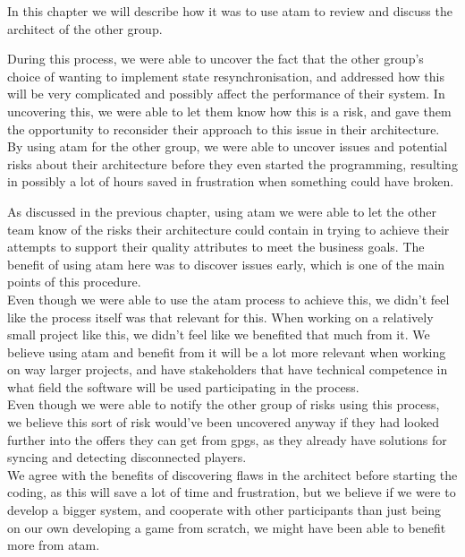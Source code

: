 In this chapter we will describe how it was to use \gls{atam} to review and discuss the architect of the other group.

During this process, we were able to uncover the fact that the other group's choice of wanting to implement state resynchronisation, and addressed how this will be very complicated and possibly affect the performance of their system. In uncovering this, we were able to let them know how this is a risk, and gave them the opportunity to reconsider their approach to this issue in their architecture. By using \gls{atam} for the other group, we were able to uncover issues and potential risks about their architecture before they even started the programming, resulting in possibly a lot of hours saved in frustration when something could have broken.

As discussed in the previous chapter, using \gls{atam} we were able to let the other team know of the risks their architecture could contain in trying to achieve their attempts to support their quality attributes to meet the business goals. The benefit of using \gls{atam} here was to discover issues early, which is one of the main points of this procedure.\\

Even though we were able to use the \gls{atam} process to achieve this, we didn't feel like the process itself was that relevant for this. When working on a relatively small project like this, we didn't feel like we benefited that much from it. We believe using \gls{atam} and benefit from it will be a lot more relevant when working on way larger projects, and have stakeholders that have technical competence in what field the software will be used participating in the process. \\

Even though we were able to notify the other group of risks using this process, we believe this sort of risk would've been uncovered anyway if they had looked further into the offers they can get from \gls{gpgs}, as they already have solutions for syncing and detecting disconnected players. \\

We agree with the benefits of discovering flaws in the architect before starting the coding, as this will save a lot of time and frustration, but we believe if we were to develop a bigger system, and cooperate with other participants than just being on our own developing a game from scratch, we might have been able to benefit more from \gls{atam}.
